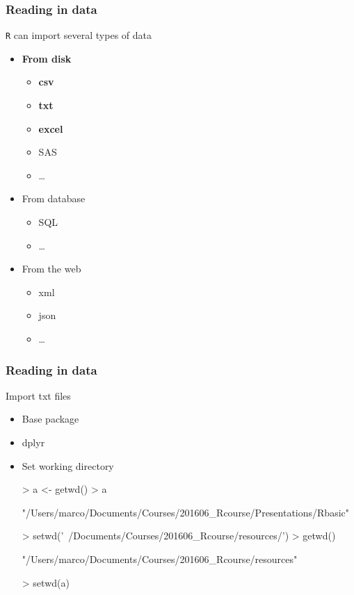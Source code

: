 \documentclass{beamer}
\begin{document}
\begin{frame}[fragile]
	\frametitle{Reading in data}
	\centering \Large \texttt{R} can import several types of data
	\begin{itemize}
		\small
		\item \textbf{From disk}
			\begin{itemize}
				\scriptsize
				\item \textbf{csv}
				\item \textbf{txt}
				\item \textbf{excel}
				\item SAS
				\item \ldots
				\small
			\end{itemize}
		\item From database
			\begin{itemize}
				\scriptsize
				\item SQL
				\item \ldots
				\small
			\end{itemize}
		\item From the web 
			\begin{itemize}
				\scriptsize
				\item xml
				\item json
				\item \ldots
				\small
			\end{itemize}
	\end{itemize}
\end{frame}



\begin{frame}[fragile]
	\frametitle{Reading in data}
	\centering \Large Import txt files
	\begin{itemize}
		\small
		\item Base package
		\item dplyr
	\vspace{20pt}
		\item Set working directory
\vspace{10pt}
\tiny
\setlength{\fancyvrbtopsep}{-1pt}
\setlength{\fancyvrbpartopsep}{-1pt}
\begin{Schunk}
\begin{Sinput}
> a <- getwd()
> a
\end{Sinput}
\begin{Soutput}
[1] "/Users/marco/Documents/Courses/201606_Rcourse/Presentations/Rbasic"
\end{Soutput}
\begin{Sinput}
> setwd('~/Documents/Courses/201606_Rcourse/resources/')
> getwd()
\end{Sinput}
\begin{Soutput}
[1] "/Users/marco/Documents/Courses/201606_Rcourse/resources"
\end{Soutput}
\begin{Sinput}
> setwd(a)
\end{Sinput}
\end{Schunk}
	\end{itemize}
\end{frame}
\end{document}

